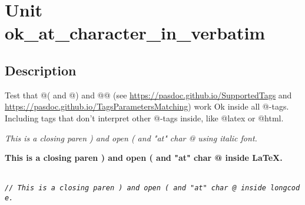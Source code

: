 \documentclass{report}
\begin{document}
\label{toc}\tableofcontents
\newpage
\newlength{\tmplength}
\chapter{Unit ok{\_}at{\_}character{\_}in{\_}verbatim}
\label{ok_at_character_in_verbatim}
\section{Description}
Test that @( and @) and @@ (see \href{https://pasdoc.github.io/SupportedTags}{https://pasdoc.github.io/SupportedTags} and \href{https://pasdoc.github.io/TagsParametersMatching}{https://pasdoc.github.io/TagsParametersMatching}) work Ok inside all @{-}tags. Including tags that don't interpret other @{-}tags inside, like @latex or @html.

\textit{This is a closing paren ) and open ( and "at" char @ using italic font.}

{\bf This is a closing paren ) and open ( and "at" char @ inside LaTeX.}



\texttt{\\\nopagebreak[3]
\textit{//~This~is~a~closing~paren~)~and~open~(~and~"at"~char~@~inside~longcode.}\\
}
\end{document}
